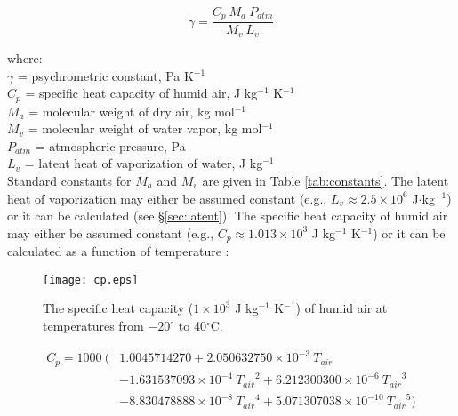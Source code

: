 \begin{equation}
\label{eq:psychro}
	\gamma = \frac{C_p\: M_a\: P_{atm}}{M_v\: L_v}
\end{equation}

\noindent where: \\
\indent $\gamma$ = psychrometric constant, Pa K$^{-1}$ \\
\indent $C_p$ = specific heat capacity of humid air, J kg$^{-1}$ K$^{-1}$\\
\indent $M_a$ = molecular weight of dry air, kg mol$^{-1}$\\
\indent $M_v$ = molecular weight of water vapor, kg mol$^{-1}$\\
\indent $P_{atm}$ = atmospheric pressure, Pa\\
\indent $L_v$ = latent heat of vaporization of water, J kg$^{-1}$\\

\noindent Standard constants for $M_a$ and $M_v$ are given in Table \ref{tab:constants}. 
The latent heat of vaporization may either be assumed constant (e.g., $L_v \approx 2.5\times 10^6$ J$\cdot$kg$^{-1}$) or it can be calculated (see \S \ref{sec:latent}). 
The specific heat capacity of humid air may either be assumed constant (e.g., $C_p \approx 1.013\times 10^3$ J kg$^{-1}$ K$^{-1}$) or it can be calculated as a function of temperature \parencite[Eq. 47]{tsilingiris08}:

\begin{figure}[ht!]
    \texttt{[image: cp.eps]}
    \caption{The specific heat capacity ($1\times 10^3$ J kg$^{-1}$ K$^{-1}$) of humid air at temperatures from $-20^{\circ}$ to 40$^{\circ}$C.}
    \label{fig:cp}
\end{figure}

\begin{equation}
\label{eq:cp}
	\begin{split}
		C_p = 1000\: ( & 1.0045714270 
		                 + 2.050632750\times 10^{-3}\: T_{air} \\
		               & - 1.631537093\times 10^{-4}\: {T_{air}}^{2} 
		                 + 6.212300300\times 10^{-6}\: {T_{air}}^{3} \\
		               & - 8.830478888\times 10^{-8}\: {T_{air}}^{4} 
		                 + 5.071307038\times 10^{-10}\: {T_{air}}^{5} )
	\end{split}
\end{equation}

